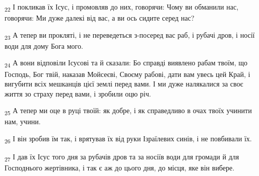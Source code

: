 \begin{tcolorbox}
\textsubscript{22} І покликав їх Ісус, і промовляв до них, говорячи: Чому ви обманили нас, говорячи: Ми дуже далекі від вас, а ви ось сидите серед нас?
\end{tcolorbox}
\begin{tcolorbox}
\textsubscript{23} А тепер ви прокляті, і не переведеться з-посеред вас раб, і рубачі дров, і носії води для дому Бога мого.
\end{tcolorbox}
\begin{tcolorbox}
\textsubscript{24} А вони відповіли Ісусові та й сказали: Бо справді виявлено рабам твоїм, що Господь, Бог твій, наказав Мойсеєві, Своєму рабові, дати вам увесь цей Край, і вигубити всіх мешканців цієї землі перед вами. І ми дуже налякалися за своє життя зо страху перед вами, і зробили оцю річ.
\end{tcolorbox}
\begin{tcolorbox}
\textsubscript{25} А тепер ми оце в руці твоїй: як добре, і як справедливо в очах твоїх учинити нам, учини.
\end{tcolorbox}
\begin{tcolorbox}
\textsubscript{26} І він зробив їм так, і врятував їх від руки Ізраїлевих синів, і не повбивали їх.
\end{tcolorbox}
\begin{tcolorbox}
\textsubscript{27} І дав їх Ісус того дня за рубачів дров та за носіїв води для громади й для Господнього жертівника, і так є аж до цього дня, до місця, яке він вибере.
\end{tcolorbox}

